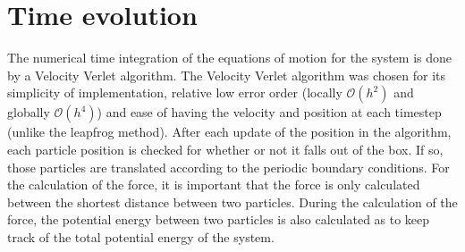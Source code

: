 \section{Time evolution}
The numerical time integration of the equations of motion for the system is done by a Velocity Verlet algorithm. The Velocity Verlet algorithm was chosen for its simplicity of implementation, relative low error order (locally $\mathcal{O}(h^2)$ and globally $\mathcal{O}(h^4)$) and ease of having the velocity and position at each timestep (unlike the leapfrog method).
After each update of the position in the algorithm, each particle position is checked for whether or not it falls out of the box. If so, those particles are translated according to the periodic boundary conditions. For the calculation of the force, it is important that the force is only calculated between the shortest distance between two particles. During the calculation of the force, the potential energy between two particles is also calculated as to keep track of the total potential energy of the system.